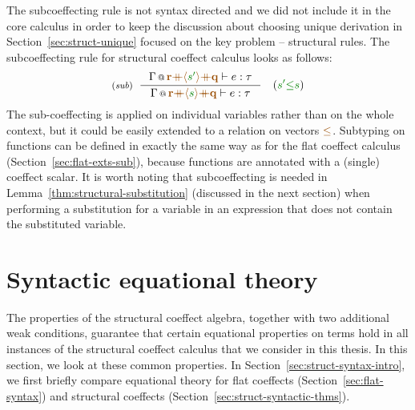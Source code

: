 The subcoeffecting rule is not syntax directed and we did not include it in the core calculus
in order to keep the discussion about choosing unique derivation in Section~\ref{sec:struct-unique}
focused on the key problem -- structural rules. The subcoeffecting rule for structural coeffect
calculus looks as follows:
%
\begin{equation*}
\tyrule{sub}
  {\coctx{\Gamma}{\aclrd{\textbf{r}} \atimes \alift{\cclrd{s'}} \atimes \aclrd{\textbf{q}}} \vdash e : \tau}
  {\coctx{\Gamma}{\aclrd{\textbf{r}} \atimes \alift{\cclrd{s}} \atimes \aclrd{\textbf{q}}} \vdash e : \tau}
\quad
(\cclrd{s'} \cleq \cclrd{s})
\end{equation*}
%
The sub-coeffecting is applied on individual variables rather than on the whole context, but it
could be easily extended to a relation on vectors $\aclrd{\leq}$. Subtyping on functions can be
defined in exactly the same way as for the flat coeffect calculus (Section~\ref{sec:flat-exts-sub}),
because functions are annotated with a (single) coeffect scalar. It is worth noting that
subcoeffecting is needed in Lemma~\ref{thm:structural-substitution} (discussed in the next
section) when performing a substitution for a variable in an expression that does not contain the
substituted variable.



%
%

\section{Syntactic equational theory}
\label{sec:struct-syntax}

The properties of the structural coeffect algebra, together with two additional weak conditions,
guarantee that certain equational properties on terms hold in all instances of the structural
coeffect calculus that we consider in this thesis. In this section, we look at these common
properties. In Section~\ref{sec:struct-syntax-intro}, we first briefly compare equational theory
for flat coeffects (Section~\ref{sec:flat-syntax}) and structural coeffects (Section~\ref{sec:struct-syntactic-thms}).

